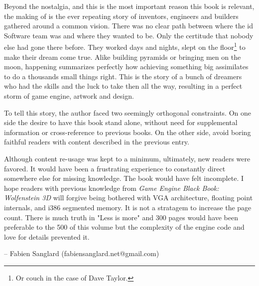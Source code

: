 Beyond the nostalgia, and this is the most important reason this book is relevant, the making of \doom is the ever repeating story of inventors, engineers and builders gathered around a common vision. There was no clear path between where the id Software team was and where they wanted to be. Only the certitude that nobody else had gone there before. They worked days and nights, slept on the floor\footnote{Or couch in the case of Dave Taylor.} to make their dream come true. Alike building pyramids or bringing men on the moon, \doom happening summarizes perfectly how achieving something big assimilates to do a thousands small things right. This is the story of a bunch of dreamers who had the skills and the luck to take then all the way, resulting in a perfect storm of game engine, artwork and design.\\
\par
 To tell this story, the author faced two seemingly orthogonal constraints. On one side the desire to have this book stand alone, without need for supplemental information or cross-reference to previous books. On the other side, avoid boring faithful readers with content described in the previous entry.\\
\par
Although content re-usage was kept to a minimum, ultimately, new readers were favored. It would have been a frustrating experience to constantly direct somewhere else for missing knowledge. The book would have felt incomplete. I hope readers with previous knowledge from \textit{Game Engine Black Book: Wolfenstein 3D} will forgive being bothered with VGA architecture, floating point internals, and i386 segmented memory. It is not a stratagem to increase the page count. There is much truth in "Less is more" and 300 pages would have been preferable to the 500 of this volume but the complexity of the engine code and love for details prevented it.\\
\par
-- Fabien Sanglard (fabiensanglard.net@gmail.com)